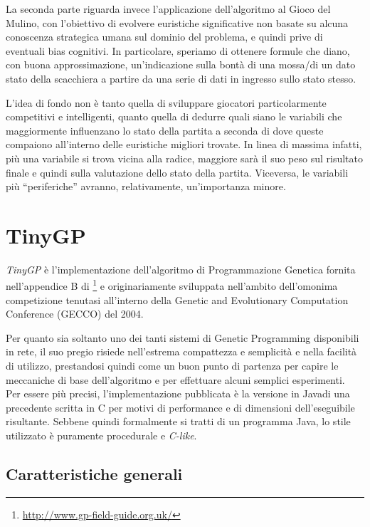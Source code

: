 \documentclass{../llncs}
\newcommand{\java}{\textsf{Java}}
\newcommand{\labelsec}[1]{\label{sec:#1}}
\newcommand{\labelssec}[1]{\label{ssec:#1}}
\begin{document}
La seconda parte riguarda invece l'applicazione dell'algoritmo al Gioco del Mulino, con l'obiettivo di evolvere euristiche significative non basate su alcuna conoscenza strategica umana sul dominio del problema, e quindi prive di eventuali bias cognitivi. In particolare, speriamo di ottenere formule che diano, con buona approssimazione, un'indicazione sulla bontà di una mossa/di un dato stato della scacchiera a partire da una serie di dati in ingresso sullo stato stesso.

L'idea di fondo non è tanto quella di sviluppare giocatori particolarmente competitivi e intelligenti, quanto quella di dedurre quali siano le variabili che maggiormente influenzano lo stato della partita a seconda di dove queste compaiono all'interno delle euristiche migliori trovate. In linea di massima infatti, più una variabile si trova vicina alla radice, maggiore sarà il suo peso sul risultato finale e quindi sulla valutazione dello stato della partita. Viceversa, le variabili più ``periferiche'' avranno, relativamente, un'importanza minore.

\section{TinyGP}
\labelsec{tinygp}

\emph{TinyGP} è l'implementazione dell'algoritmo di Programmazione Genetica fornita nell'appendice B di \footnote{\url{http://www.gp-field-guide.org.uk/}} e originariamente sviluppata nell'ambito dell'omonima competizione tenutasi all'interno della Genetic and Evolutionary Computation Conference (GECCO) del 2004.

Per quanto sia soltanto uno dei tanti sistemi di Genetic Programming disponibili in rete, il suo pregio risiede nell'estrema compattezza e semplicità e nella facilità di utilizzo, prestandosi quindi come un buon punto di partenza per capire le meccaniche di base dell'algoritmo e per effettuare alcuni semplici esperimenti.\\

Per essere più precisi, l'implementazione pubblicata è la versione in \java di una precedente scritta in C per motivi di performance e di dimensioni dell'eseguibile risultante. Sebbene quindi formalmente si tratti di un programma \java, lo stile utilizzato è puramente procedurale e \emph{C-like}.

\subsection{Caratteristiche generali}
\labelssec{TinyGP_mainFeatures}
\end{document}
